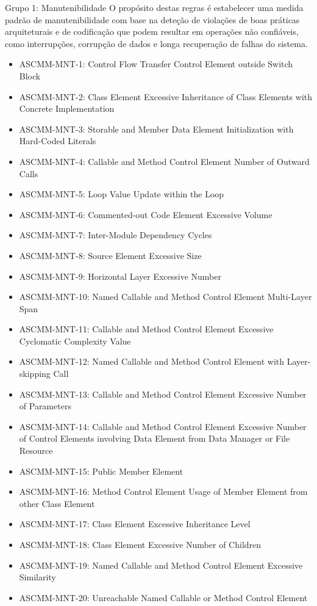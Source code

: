 \documentclass[openany,10pt,a4paper]{article}
\begin{document}
\begin{appendix}
Grupo 1: Manutenibilidade
O propósito destas regras é estabelecer uma medida padrão de manutenibilidade com base na deteção de violações de boas práticas arquiteturais e de codificação que podem resultar em operações não confiáveis, como interrupções, corrupção de dados e longa recuperação de falhas do sistema.
\begin{itemize}
	\setlength\itemsep{0em}
	\item ASCMM-MNT-1: Control Flow Transfer Control Element outside Switch Block
	\item ASCMM-MNT-2: Class Element Excessive Inheritance of Class Elements with Concrete Implementation
	\item ASCMM-MNT-3: Storable and Member Data Element Initialization with Hard-Coded Literals
	\item ASCMM-MNT-4: Callable and Method Control Element Number of Outward Calls
	\item ASCMM-MNT-5: Loop Value Update within the Loop
	\item ASCMM-MNT-6: Commented-out Code Element Excessive Volume
	\item ASCMM-MNT-7: Inter-Module Dependency Cycles
	\item ASCMM-MNT-8: Source Element Excessive Size
	\item ASCMM-MNT-9: Horizontal Layer Excessive Number
	\item ASCMM-MNT-10: Named Callable and Method Control Element Multi-Layer Span
	\item ASCMM-MNT-11: Callable and Method Control Element Excessive Cyclomatic Complexity Value
	\item ASCMM-MNT-12: Named Callable and Method Control Element with Layer-skipping Call
	\item ASCMM-MNT-13: Callable and Method Control Element Excessive Number of Parameters
	\item ASCMM-MNT-14: Callable and Method Control Element Excessive Number of Control Elements involving Data Element from Data Manager or File Resource
	\item ASCMM-MNT-15: Public Member Element	
	\item ASCMM-MNT-16: Method Control Element Usage of Member Element from other Class Element
	\item ASCMM-MNT-17: Class Element Excessive Inheritance Level
	\item ASCMM-MNT-18: Class Element Excessive Number of Children
	\item ASCMM-MNT-19: Named Callable and Method Control Element Excessive Similarity
	\item ASCMM-MNT-20: Unreachable Named Callable or Method Control Element
\end{itemize}


\end{appendix}
\end{document}
